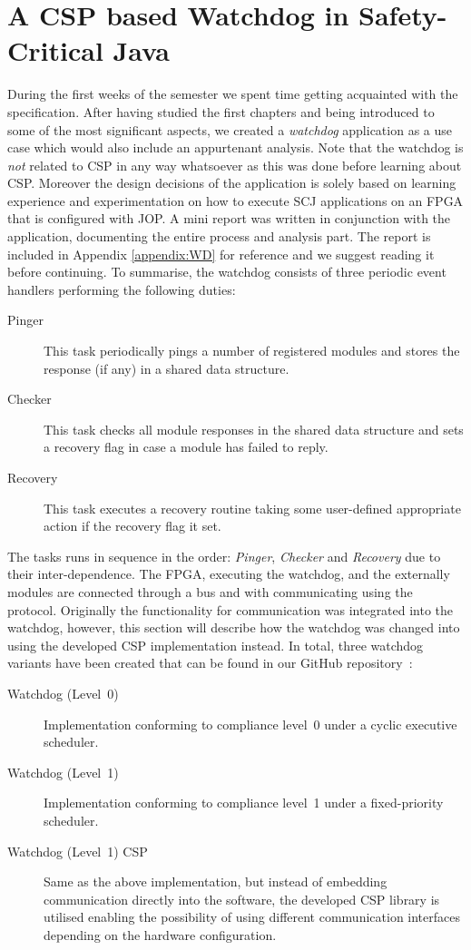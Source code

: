 \chapter{A CSP based Watchdog in Safety-Critical Java}
\label{chapter:watchdogcsp}
During the first weeks of the semester we spent time getting acquainted with the specification. After having studied the first chapters and being introduced to some of the most significant aspects, we created a \textit{watchdog} application as a use case which would also include an appurtenant analysis. Note that the watchdog is \textit{not} related to CSP in any way whatsoever as this was done before learning about CSP. Moreover the design decisions of the application is solely based on learning experience and experimentation on how to execute SCJ applications on an FPGA that is configured with JOP. A mini report was written in conjunction with the application, documenting the entire process and analysis part. The report is included in Appendix \ref{appendix:WD} for reference and we suggest reading it before continuing. To summarise, the watchdog consists of three periodic event handlers performing the following duties:

\begin{description}
	\item[Pinger] This task periodically pings a number of registered modules and stores the response (if any) in a shared data structure.
	\item[Checker] This task checks all module responses in the shared data structure and sets a recovery flag in case a module has failed to reply.
	\item[Recovery] This task executes a recovery routine taking some user-defined appropriate action if the recovery flag it set. 
\end{description}

The tasks runs in sequence in the order: \textit{Pinger}, \textit{Checker} and \textit{Recovery} due to their inter-dependence. The FPGA, executing the watchdog, and the externally modules are connected through a bus and with communicating using the \iic protocol. Originally the functionality for \iic communication was integrated into the watchdog, however, this section will describe how the watchdog was changed into using the developed CSP implementation instead. In total, three watchdog variants have been created that can be found in our GitHub repository~\cite{SW902e12:CSPinSCJ}:

\begin{description}
	\item[Watchdog (Level~0)] Implementation conforming to compliance level~0 under a cyclic executive scheduler.
	\item[Watchdog (Level~1)] Implementation conforming to compliance level~1 under a fixed-priority scheduler. 
	\item[Watchdog (Level~1) CSP] Same as the above implementation, but instead of embedding \iic communication directly into the software, the developed CSP library is utilised enabling the possibility of using different communication interfaces depending on the hardware configuration.
\end{description}

